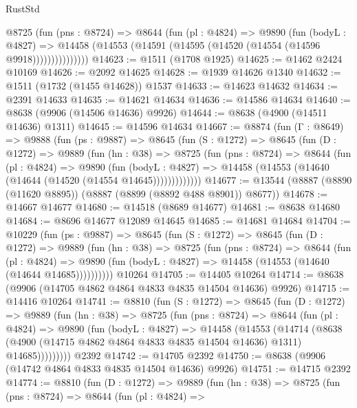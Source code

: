 \begin{lexlean}{RustStd}
\begin{coremodule}
              @8725
                (fun (pns : @8724) =>
                @8644
                  (fun (pl : @4824) =>
                  @9890
                    (fun (bodyL : @4827) =>
                    @14458 (@14553 (@14591 (@14595 (@14520 (@14554 (@14596 @9918)))))))))))))))
@14623 := @1511 (@1708 @1925)
@14625 := @1462 @2424 @10169
@14626 := @2092 @14625
@14628 := @1939 @14626 @1340
@14632 := @1511 (@1732 (@1455 @14628)) @1537
@14633 := @14623 @14632
@14634 := @2391 @14633
@14635 := @14621 @14634
@14636 := @14586 @14634
@14640 := @8638 (@9906 (@14506 @14636) @9926)
@14644 := @8638 (@4900 (@14511 @14636) @1311)
@14645 := @14596 @14634
@14667 := @8874
    (fun (Γ : @8649) =>
    @9888
      (fun (ps : @9887) =>
      @8645
        (fun (S : @1272) =>
        @8645
          (fun (D : @1272) =>
          @9889
            (fun (hn : @38) =>
            @8725
              (fun (pns : @8724) =>
              @8644
                (fun (pl : @4824) =>
                @9890
                  (fun (bodyL : @4827) =>
                  @14458 (@14553 (@14640 (@14644 (@14520 (@14554 @14645)))))))))))))
@14677 := @13544 (@8887 (@8890 (@11620 @8895)) (@8887 (@8899 (@8892 @488 @8901)) @8677))
@14678 := @14667 @14677
@14680 := @14518 (@8689 @14677)
@14681 := @8638 @14680
@14684 := @8696 @14677 @12089 @14645
@14685 := @14681 @14684
@14704 := @10229
    (fun (ps : @9887) =>
    @8645
      (fun (S : @1272) =>
      @8645
        (fun (D : @1272) =>
        @9889
          (fun (hn : @38) =>
          @8725
            (fun (pns : @8724) =>
            @8644
              (fun (pl : @4824) =>
              @9890 (fun (bodyL : @4827) => @14458 (@14553 (@14640 (@14644 @14685))))))))))
    @10264
@14705 := @14405 @10264
@14714 := @8638 (@9906 (@14705 @4862 @4864 @4833 @4835 @14504 @14636) @9926)
@14715 := @14416 @10264
@14741 := @8810
    (fun (S : @1272) =>
    @8645
      (fun (D : @1272) =>
      @9889
        (fun (hn : @38) =>
        @8725
          (fun (pns : @8724) =>
          @8644
            (fun (pl : @4824) =>
            @9890
              (fun (bodyL : @4827) =>
              @14458
                (@14553
                  (@14714
                    (@8638
                      (@4900 (@14715 @4862 @4864 @4833 @4835 @14504 @14636) @1311)
                      @14685)))))))))
    @2392
@14742 := @14705 @2392
@14750 := @8638 (@9906 (@14742 @4864 @4833 @4835 @14504 @14636) @9926)
@14751 := @14715 @2392
@14774 := @8810
    (fun (D : @1272) =>
    @9889
      (fun (hn : @38) =>
      @8725
        (fun (pns : @8724) =>
        @8644
          (fun (pl : @4824) =>

\end{coremodule}
\end{lexlean}
